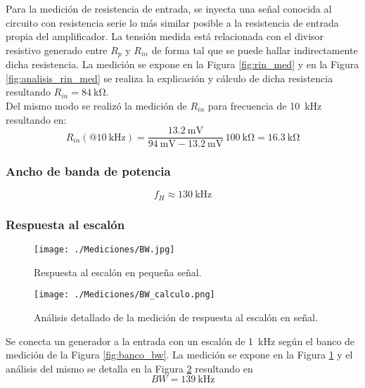 		Para la medición de resistencia de entrada, se inyecta una señal conocida al circuito con resistencia serie lo más similar posible a la resistencia de entrada propia del amplificador. La tensión medida está relacionada con el divisor resistivo generado entre $R_{p}$ y $R_{in}$ de forma tal que se puede hallar indirectamente dicha resistencia. La medición se expone en la Figura \ref{fig:rin_med} y en la Figura \ref{fig:analisis_rin_med} se realiza la explicación y cálculo de dicha resistencia resultando $\boxed{R_{in}=\SI{84}{\kilo\ohm}}$.\\

		Del mismo modo se realizó la medición de $R_{in}$ para frecuencia de \SI{10}{\kHz} resultando en:
		\begin{equation*}
			R_{in}(@\SI{10}{\kHz})  = \frac{\SI{13.2}{\mV}}{\SI{94}{\mV} - \SI{13.2}{\mV}} \, \SI{100}{\kilo\ohm} = \boxed{\SI{16.3}{\kilo\ohm}}
		\end{equation*}
		\subsubsection{Ancho de banda de potencia}

		
		\begin{equation*}
			\boxed{f_H \approx \SI{130}{\kHz}}
		\end{equation*}

		\subsubsection{Respuesta al escalón}
		\begin{figure}[h!]
			\centering
			\texttt{[image: ./Mediciones/BW.jpg]}
			\caption{Respuesta al escalón en pequeña señal.}
			\label{fig:escalon_ss}
		\end{figure}

		\begin{figure}[h!]
			\centering
			\texttt{[image: ./Mediciones/BW\_calculo.png]}
			\caption{Análisis detallado de la medición de respuesta al escalón en señal.}
			\label{fig:analisis_escalon_ss}
		\end{figure}

		Se conecta un generador a la entrada con un escalón de \SI{1}{\kHz} según el banco de medición de la Figura \ref{fig:banco_bw}. La medición se expone en la Figura \ref{fig:escalon_ss} y el análisis del mismo se detalla en la Figura \ref{fig:analisis_escalon_ss} resultando en
		\begin{equation*}
			\boxed{BW = \SI{139}{\kHz}}
		\end{equation*}

